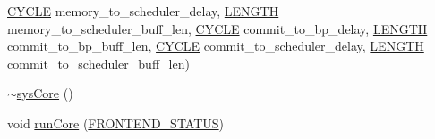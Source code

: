 \begin{DoxyCompactItemize}
\hyperlink{global_2global_8h_a7e19a550ec11d1ed921deb20c22efb5b}{CYCLE} memory\_\-to\_\-scheduler\_\-delay, \hyperlink{binaryTranslator_2global_8h_a9f35cc405c37836572563f16d0302ba6}{LENGTH} memory\_\-to\_\-scheduler\_\-buff\_\-len, \hyperlink{global_2global_8h_a7e19a550ec11d1ed921deb20c22efb5b}{CYCLE} commit\_\-to\_\-bp\_\-delay, \hyperlink{binaryTranslator_2global_8h_a9f35cc405c37836572563f16d0302ba6}{LENGTH} commit\_\-to\_\-bp\_\-buff\_\-len, \hyperlink{global_2global_8h_a7e19a550ec11d1ed921deb20c22efb5b}{CYCLE} commit\_\-to\_\-scheduler\_\-delay, \hyperlink{binaryTranslator_2global_8h_a9f35cc405c37836572563f16d0302ba6}{LENGTH} commit\_\-to\_\-scheduler\_\-buff\_\-len)
\item 
\hyperlink{classsysCore_a4bc59653314c1a0f57a857e704b4b36c}{$\sim$sysCore} ()
\item 
void \hyperlink{classsysCore_aaafa43a2951680e1fdc83769650d7bba}{runCore} (\hyperlink{global_2global_8h_afd483fa40f0fa2b1ac067845b91f0c6e}{FRONTEND\_\-STATUS})
\end{DoxyCompactItemize}


